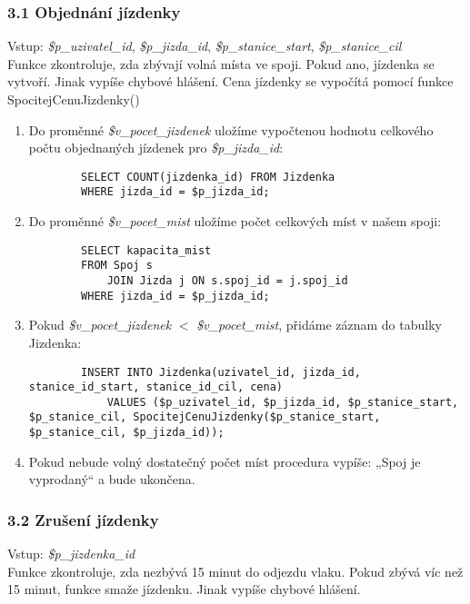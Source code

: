 \documentclass[11pt]{article}
\begin{document}

\subsubsection*{3.1	Objednání jízdenky}
Vstup: \textit{\$p\_uzivatel\_id}, \textit{\$p\_jizda\_id}, \textit{\$p\_stanice\_start}, \textit{\$p\_stanice\_cil}\\
Funkce zkontroluje, zda zbývají volná místa ve spoji. Pokud ano, jízdenka se vytvoří. Jinak vypíše chybové hlášení. Cena jízdenky se vypočítá pomocí funkce SpocitejCenuJizdenky()

\begin{enumerate}
    \item Do proměnné \textit{\$v\_pocet\_jizdenek} uložíme vypočtenou hodnotu celkového počtu objednaných jízdenek pro \textit{\$p\_jizda\_id}:
    \begin{lstlisting}
        SELECT COUNT(jizdenka_id) FROM Jizdenka
        WHERE jizda_id = $p_jizda_id;
    \end{lstlisting}

    \item Do proměnné \textit{\$v\_pocet\_mist} uložíme počet celkových míst v našem spoji:
    \begin{lstlisting}
        SELECT kapacita_mist
        FROM Spoj s
            JOIN Jizda j ON s.spoj_id = j.spoj_id
        WHERE jizda_id = $p_jizda_id;
    \end{lstlisting}

    \item Pokud \textit{\$v\_pocet\_jizdenek} $<$ \textit{\$v\_pocet\_mist}, přidáme záznam do tabulky Jizdenka:
    \begin{lstlisting}
        INSERT INTO Jizdenka(uzivatel_id, jizda_id, stanice_id_start, stanice_id_cil, cena)
            VALUES ($p_uzivatel_id, $p_jizda_id, $p_stanice_start, $p_stanice_cil, SpocitejCenuJizdenky($p_stanice_start, $p_stanice_cil, $p_jizda_id));
    \end{lstlisting}

    \item Pokud nebude volný dostatečný počet míst procedura vypíše: „Spoj je vyprodaný“ a bude ukončena.
\end{enumerate}


\subsubsection*{3.2 Zrušení jízdenky}
Vstup: \textit{\$p\_jizdenka\_id}\\
Funkce zkontroluje, zda nezbývá 15 minut do odjezdu vlaku. Pokud zbývá víc než 15 minut, funkce smaže jízdenku. Jinak vypíše chybové hlášení.
\end{document}
